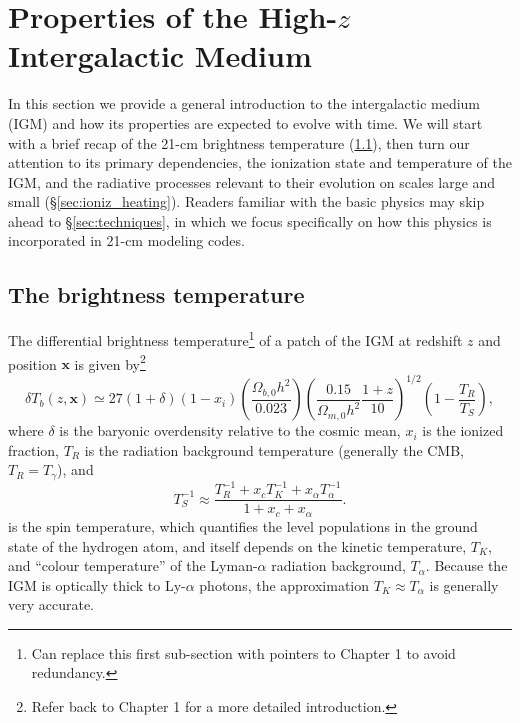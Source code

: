 \section{Properties of the High-$z$ Intergalactic Medium} \label{sec:RT}
In this section we provide a general introduction to the intergalactic medium (IGM) and how its properties are expected to evolve with time. We will start with a brief recap of the 21-cm brightness temperature (\ref{sec:dTb}), then turn our attention to its primary dependencies, the ionization state and temperature of the IGM, and the radiative processes relevant to their evolution on scales large and small (\S\ref{sec:ioniz_heating}). Readers familiar with the basic physics may skip ahead to \S\ref{sec:techniques}, in which we focus specifically on how this physics is incorporated in 21-cm modeling codes.

\subsection{The brightness temperature} \label{sec:dTb}
The differential brightness temperature\footnote{Can replace this first sub-section with pointers to Chapter 1 to avoid redundancy.} of a patch of the IGM at redshift $z$ and position $\mathbf{x}$ is given by\footnote{Refer back to Chapter 1 for a more detailed introduction.} 
\begin{equation}
    \delta T_b(z, \mathbf{x}) \simeq 27 (1 + \delta) (1 - x_i) \left(\frac{\Omega_{b,0} h^2}{0.023} \right) \left(\frac{0.15}{\Omega_{m,0} h^2} \frac{1 + z}{10} \right)^{1/2} \left(1 - \frac{T_R}{T_S} \right) , \label{eq:dTb}
\end{equation}
where $\delta$ is the baryonic overdensity relative to the cosmic mean, $x_i$ is the ionized fraction, $T_R$ is the radiation background temperature (generally the CMB, $T_R = T_{\gamma}$), and
\begin{equation}
    T_S^{-1} \approx \frac{T_R^{-1} + x_c T_K^{-1} + x_{\alpha} T_{\alpha}^{-1}}{1 + x_c + x_{\alpha}} . \label{eq:Ts}
\end{equation}
is the spin temperature, which quantifies the level populations in the ground state of the hydrogen atom, and itself depends on the kinetic temperature, $T_K$, and ``colour temperature'' of the Lyman-$\alpha$ radiation background, $T_{\alpha}$. Because the IGM is optically thick to Ly-$\alpha$ photons, the approximation $T_K \approx T_{\alpha}$ is generally very accurate.

